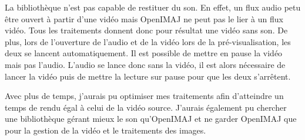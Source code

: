 \documentclass[10pt,a4paper]{article}
\begin{document}
La bibliothèque n'est pas capable de restituer du son. En effet, un flux audio petu être ouvert à partir d'une vidéo mais OpenIMAJ ne peut pas le lier à un flux vidéo. Tous les traitements donnent donc pour résultat une vidéo sans son. De plus, lors de l'ouverture de l'audio et de la vidéo lors de la pré-visualisation, les deux se lancent automatiquement. Il est possible de mettre en pause la vidéo mais pas l'audio. L'audio se lance donc sans la vidéo, il est alors nécessaire de lancer la vidéo puis de mettre la lecture sur pause pour que les deux s'arrêtent.

Avec plus de temps, j'aurais pu optimiser mes traitements afin d'atteindre un temps de rendu égal à celui de la vidéo source. J'aurais également pu chercher une bibliothèque gérant mieux le son qu'OpenIMAJ et ne garder OpenIMAJ que pour la gestion de la vidéo et le traitements des images.





\newpage

\end{document}
